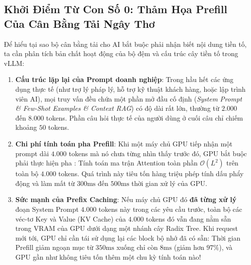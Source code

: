 \subsection{Khởi Điểm Từ Con Số 0: Thảm Họa Prefill Của Cân Bằng Tải Ngây Thơ}
Để hiểu tại sao bộ cân bằng tải cho AI bắt buộc phải nhận biết nội dung tiền tố, ta cần phân tích bản chất hoạt động của bộ đệm  và cấu trúc cây tiền tố  trong vLLM:
\begin{enumerate}
  \item \textbf{Cấu trúc lặp lại của Prompt doanh nghiệp}:
  Trong hầu hết các ứng dụng thực tế (như trợ lý pháp lý, hỗ trợ kỹ thuật khách hàng, hoặc lập trình viên AI), mọi truy vấn đều chứa một phần mở đầu cố định (\textit{System Prompt \& Few-Shot Examples \& Context RAG}) có độ dài rất lớn, thường từ $2.000$ đến $8.000$ tokens. Phần câu hỏi thực tế của người dùng ở cuối câu chỉ chiếm khoảng $50$ tokens.
  \item \textbf{Chi phí tính toán pha Prefill}:
  Khi một máy chủ GPU tiếp nhận một prompt dài $4.000$ tokens mà nó chưa từng nhìn thấy trước đó, GPU bắt buộc phải thực hiện pha : Tính toán ma trận Attention toàn phần $\mathcal{O}(L^2)$ trên toàn bộ $4.000$ tokens. Quá trình này tiêu tốn hàng triệu phép tính dấu phẩy động và làm mất từ $300\text{ms}$ đến $500\text{ms}$ thời gian xử lý của GPU.
  \item \textbf{Sức mạnh của Prefix Caching}:
  Nếu máy chủ GPU đó \textbf{đã từng xử lý} đoạn System Prompt $4.000$ tokens này trong các yêu cầu trước, toàn bộ các véc-tơ Key và Value (KV Cache) của $4.000$ tokens đó vẫn đang nằm sẵn trong VRAM của GPU dưới dạng một nhánh cây Radix Tree.
  Khi request mới tới, GPU chỉ cần tái sử dụng lại các block bộ nhớ đã có sẵn: Thời gian Prefill giảm ngoạn mục từ $350\text{ms}$ xuống chỉ còn \textbf{$8\text{ms}$} (giảm hơn $97\%$), và GPU gần như không tiêu tốn thêm một chu kỳ tính toán nào!
\end{enumerate}

